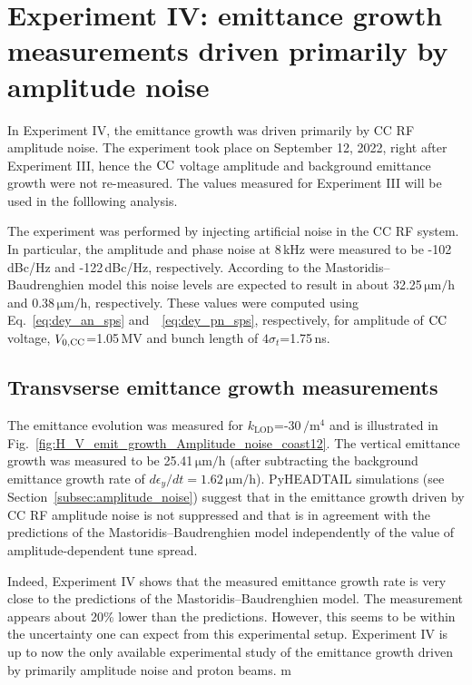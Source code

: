 \section{Experiment IV: emittance growth measurements driven primarily by amplitude noise}\label{sec:exp4_amplitude_noise}

In Experiment IV, the emittance growth was driven primarily by CC RF amplitude noise. The experiment took place on September 12, 2022, right after Experiment III, hence the ${\mathrm{CC}}$ voltage amplitude and background emittance growth were not re-measured. The values measured for Experiment III will be used in the folllowing analysis.

The experiment was performed by injecting artificial noise in the CC RF system. In particular, the amplitude and phase noise at 8\,kHz were measured to be -102\,dBc/Hz and -122\,dBc/Hz, respectively. According to the Mastoridis--Baudrenghien model this noise levels are expected to result in about 32.25\,$\mathrm{\mu m/h}$ and 0.38\,$\mathrm{\mu m/h}$, respectively. These values were computed using Eq.~\eqref{eq:dey_an_sps} and~~\eqref{eq:dey_pn_sps}, respectively, for amplitude of ${\mathrm{CC}}$ voltage, ${V_\mathrm{0, CC}}$=1.05\,MV and bunch length of $4 \sigma_t$=1.75\,ns.

\subsection{Transvserse emittance growth measurements}
The emittance evolution was measured for $k_\mathrm{LOD}$=-30\,$\mathrm{/m^4}$ and is illustrated in Fig.~\ref{fig:H_V_emit_growth_Amplitude_noise_coast12}. The vertical emittance growth was measured to be 25.41\,$\mathrm{\mu m/h}$ (after subtracting the background emittance growth rate of $d\epsilon_y/dt = 1.62$\,$\mathrm{\mu m/h}$). PyHEADTAIL simulations (see Section~\ref{subsec:amplitude_noise}) suggest that in the emittance growth driven by CC RF amplitude noise is not suppressed and that is in agreement with the predictions of the Mastoridis--Baudrenghien model independently of the value of amplitude-dependent tune spread. 

Indeed, Experiment IV shows that the measured emittance growth rate is very close to the predictions of the Mastoridis--Baudrenghien model. The measurement appears about 20$\%$ lower than the predictions. However, this seems to be within the uncertainty one can expect from this experimental setup. Experiment IV is up to now the only available experimental study of the emittance growth driven by primarily amplitude noise and proton beams.
m

